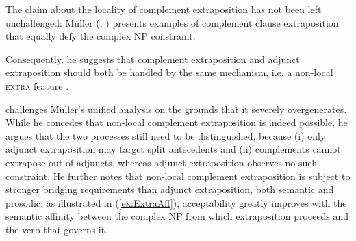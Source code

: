 \documentclass[output=paper
	        ,collection
	        ,collectionchapter
 	        ,biblatex
                ,babelshorthands
                ,newtxmath
                ,draftmode
                ,colorlinks, citecolor=brown
]{langscibook}
\begin{document}
{The claim about the locality of complement extraposition has not been
left unchallenged: Müller (\citeyear[]{Mueller99a};
\citeyear[]{Mueller2004d}) presents examples of complement
clause extraposition that equally defy the complex NP constraint.

 \begin{exe}
  \ex 
  \begin{xlist}
    
    
  \end{xlist}
\end{exe}

Consequently, he suggests that complement extraposition and adjunct
extraposition should both be handled by the same mechanism, i.e. a
non-local \textsc{extra} feature \citep{Keller:95,Mueller99a}.

\citet{crysmann_b09xtra} challenges Müller's unified analysis on the
grounds that it severely overgenerates.  While he concedes that
non-local complement extraposition is indeed possible, he argues that
the two processes still need to be distinguished, because (i) only
adjunct extraposition may target split antecedents and (ii)
complements cannot extrapose out of adjuncts, whereas adjunct
extraposition observes no such constraint.  He further notes that
non-local complement extraposition is subject to stronger bridging
requirements than adjunct extraposition, both semantic and prosodic:
as illustrated in (\ref{ex:ExtraAff}), acceptability greatly improves
with the semantic affinity between the complex NP from which
extraposition proceeds and the verb that governs it.

}
\end{document}
